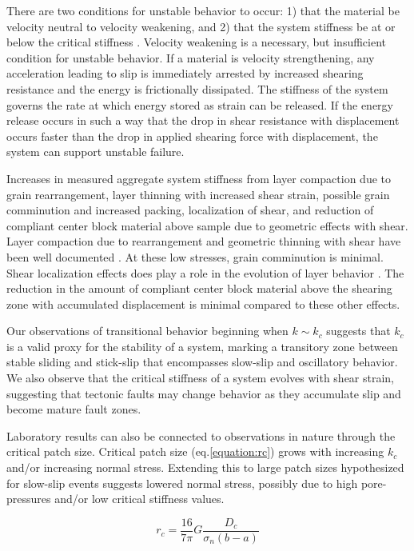\documentclass[11pt]{article}
\begin{document}
There are two conditions for unstable behavior to occur: 1) that the material be
velocity neutral to velocity weakening, and 2) that the system stiffness be at
or below the critical stiffness \cite{Marone:1998, Scholz:2002}. Velocity
weakening is a necessary, but insufficient condition for unstable behavior. If a
material is velocity strengthening, any acceleration leading to slip is
immediately arrested by increased shearing resistance and the energy is
frictionally dissipated. The stiffness of the system governs the rate at which
energy stored as strain can be released. If the energy release occurs in such a
way that the drop in shear resistance with displacement occurs faster than the
drop in applied shearing force with displacement, the system can support
unstable failure.

Increases in measured aggregate system stiffness from layer compaction due to
grain rearrangement, layer thinning with increased shear strain, possible grain
comminution and increased packing, localization of shear, and reduction of
compliant center block material above sample due to geometric effects with
shear. Layer compaction due to rearrangement and geometric thinning with shear
have been well documented \cite{Scott:1994}.  At these low stresses, grain
comminution is minimal. Shear localization effects does play a role in the
evolution of layer behavior \cite{Logan:1992}. The reduction in the amount of
compliant center block material above the shearing zone with accumulated
displacement is minimal compared to these other effects.

Our observations of transitional behavior beginning when $k \sim k_c$ suggests
that $k_c$ is a valid proxy for the stability of a system, marking a transitory
zone between stable sliding and stick-slip that encompasses slow-slip and
oscillatory behavior. We also observe that the critical stiffness of a system
evolves with shear strain, suggesting that tectonic faults may change behavior
as they accumulate slip and become mature fault zones.

Laboratory results can also be connected to observations in nature through the
critical patch size. Critical patch size (eq.\ref{equation:rc}) grows with
increasing $k_c$ and/or increasing normal stress. Extending this to large patch
sizes hypothesized for slow-slip events suggests lowered normal stress, possibly
due to high pore-pressures and/or low critical stiffness values.

\begin{equation}
    r_c = \frac{16}{7\pi}G \frac{D_c}{\sigma_n (b-a)}
    \label{equation:rc}
\end{equation}
\end{document}
